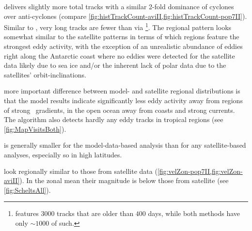 \renewcommand{\run}[1]{#1-pop7II}
\renewcommand{\RUN}{pop7-\MII: }

 delivers slightly more total tracks with a similar 2-fold dominance of cyclones over anti-cyclones (compare \cref{fig:histTrackCount-aviII,fig:histTrackCount-pop7II}). Similar to \aviII, very long tracks are fewer than via \aviI \footnote{\aviI features $3000$ tracks that are older than $400$ days, while both \MII methods have only $\sim1000$ of such.}. The regional pattern looks somewhat similar to the satellite patterns in terms of which regions feature the strongest eddy activity, with the exception of an unrealistic abundance of eddies right along the Antarctic coast  where no eddies were detected for the satellite data likely due to sea ice and/or the inherent lack of polar data due to the satellites' orbit-inclinations.

 more important difference between model- and satellite regional distributions is that the model results indicate significantly less eddy activity away from regions of strong \SSH~gradients, in the open ocean away from coasts and strong currents. The algorithm also detects hardly any eddy tracks in tropical regions (see \cref{fig:MapVisitsBoth}).

 is generally smaller for the model-data-based analysis than for any satellite-based analyses, especially so in high latitudes.

 look regionally similar to those from satellite data (\cref{fig:velZon-pop7II,fig:velZon-aviII}). In the zonal mean their magnitude is below those from satellite (see \cref{fig:ScheltsAll}).

